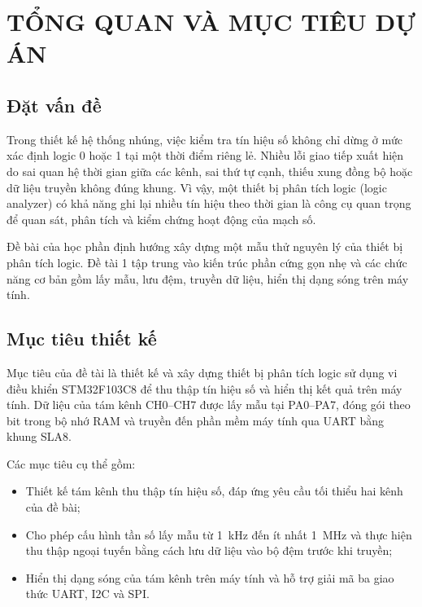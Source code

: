 \chapter{TỔNG QUAN VÀ MỤC TIÊU DỰ ÁN}\label{tux1ed5ng-quan-vuxe0-mux1ee5c-tiuxeau-dux1ef1-uxe1n}

\section{Đặt vấn đề}\label{ux111ux1eb7t-vux1ea5n-ux111ux1ec1}

Trong thiết kế hệ thống nhúng, việc kiểm tra tín hiệu số không chỉ dừng ở mức xác định logic 0 hoặc 1 tại một thời điểm riêng lẻ. Nhiều lỗi giao tiếp xuất hiện do sai quan hệ thời gian giữa các kênh, sai thứ tự cạnh, thiếu xung đồng bộ hoặc dữ liệu truyền không đúng khung. Vì vậy, một thiết bị phân tích logic (logic analyzer) có khả năng ghi lại nhiều tín hiệu theo thời gian là công cụ quan trọng để quan sát, phân tích và kiểm chứng hoạt động của mạch số.

Đề bài của học phần định hướng xây dựng một mẫu thử nguyên lý của thiết bị phân tích logic. Đề tài 1 tập trung vào kiến trúc phần cứng gọn nhẹ và các chức năng cơ bản gồm lấy mẫu, lưu đệm, truyền dữ liệu, hiển thị dạng sóng trên máy tính.

\section{Mục tiêu thiết kế}\label{mux1ee5c-tiuxeau-thiux1ebft-kux1ebf}

Mục tiêu của đề tài là thiết kế và xây dựng thiết bị phân tích logic sử dụng vi điều khiển STM32F103C8 để thu thập tín hiệu số và hiển thị kết quả trên máy tính. Dữ liệu của tám kênh CH0--CH7 được lấy mẫu tại PA0--PA7, đóng gói theo bit trong bộ nhớ RAM và truyền đến phần mềm máy tính qua UART bằng khung SLA8.

Các mục tiêu cụ thể gồm:
\begin{itemize}
\item Thiết kế tám kênh thu thập tín hiệu số, đáp ứng yêu cầu tối thiểu hai kênh của đề bài;
\item Cho phép cấu hình tần số lấy mẫu từ 1~kHz đến ít nhất 1~MHz và thực hiện thu thập ngoại tuyến bằng cách lưu dữ liệu vào bộ đệm trước khi truyền;
\item Hiển thị dạng sóng của tám kênh trên máy tính và hỗ trợ giải mã ba giao thức UART, I2C và SPI.
\end{itemize}

